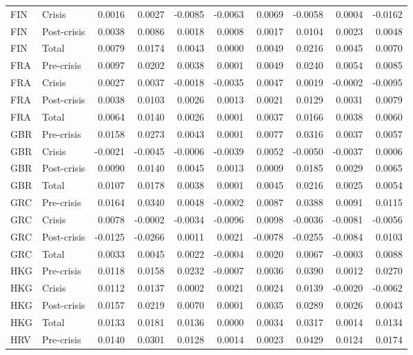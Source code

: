 \begin{longtable}[t]{llrrrrrrrr}
FIN & Crisis & 0.0016 & 0.0027 & -0.0085 & -0.0063 & 0.0069 & -0.0058 & 0.0004 & -0.0162\\
FIN & Post-crisis & 0.0038 & 0.0086 & 0.0018 & 0.0008 & 0.0017 & 0.0104 & 0.0023 & 0.0048\\
FIN & Total & 0.0079 & 0.0174 & 0.0043 & 0.0000 & 0.0049 & 0.0216 & 0.0045 & 0.0070\\
\addlinespace
FRA & Pre-crisis & 0.0097 & 0.0202 & 0.0038 & 0.0001 & 0.0049 & 0.0240 & 0.0054 & 0.0085\\
FRA & Crisis & 0.0027 & 0.0037 & -0.0018 & -0.0035 & 0.0047 & 0.0019 & -0.0002 & -0.0095\\
FRA & Post-crisis & 0.0038 & 0.0103 & 0.0026 & 0.0013 & 0.0021 & 0.0129 & 0.0031 & 0.0079\\
FRA & Total & 0.0064 & 0.0140 & 0.0026 & 0.0001 & 0.0037 & 0.0166 & 0.0038 & 0.0060\\
GBR & Pre-crisis & 0.0158 & 0.0273 & 0.0043 & 0.0001 & 0.0077 & 0.0316 & 0.0037 & 0.0057\\
\addlinespace
GBR & Crisis & -0.0021 & -0.0045 & -0.0006 & -0.0039 & 0.0052 & -0.0050 & -0.0037 & 0.0006\\
GBR & Post-crisis & 0.0090 & 0.0140 & 0.0045 & 0.0013 & 0.0009 & 0.0185 & 0.0029 & 0.0065\\
GBR & Total & 0.0107 & 0.0178 & 0.0038 & 0.0001 & 0.0045 & 0.0216 & 0.0025 & 0.0054\\
GRC & Pre-crisis & 0.0164 & 0.0340 & 0.0048 & -0.0002 & 0.0087 & 0.0388 & 0.0091 & 0.0115\\
GRC & Crisis & 0.0078 & -0.0002 & -0.0034 & -0.0096 & 0.0098 & -0.0036 & -0.0081 & -0.0056\\
\addlinespace
GRC & Post-crisis & -0.0125 & -0.0266 & 0.0011 & 0.0021 & -0.0078 & -0.0255 & -0.0084 & 0.0103\\
GRC & Total & 0.0033 & 0.0045 & 0.0022 & -0.0004 & 0.0020 & 0.0067 & -0.0003 & 0.0088\\
HKG & Pre-crisis & 0.0118 & 0.0158 & 0.0232 & -0.0007 & 0.0036 & 0.0390 & 0.0012 & 0.0270\\
HKG & Crisis & 0.0112 & 0.0137 & 0.0002 & 0.0021 & 0.0024 & 0.0139 & -0.0020 & -0.0062\\
HKG & Post-crisis & 0.0157 & 0.0219 & 0.0070 & 0.0001 & 0.0035 & 0.0289 & 0.0026 & 0.0043\\
\addlinespace
HKG & Total & 0.0133 & 0.0181 & 0.0136 & 0.0000 & 0.0034 & 0.0317 & 0.0014 & 0.0134\\
HRV & Pre-crisis & 0.0140 & 0.0301 & 0.0128 & 0.0014 & 0.0023 & 0.0429 & 0.0124 & 0.0174\\

\end{longtable}
